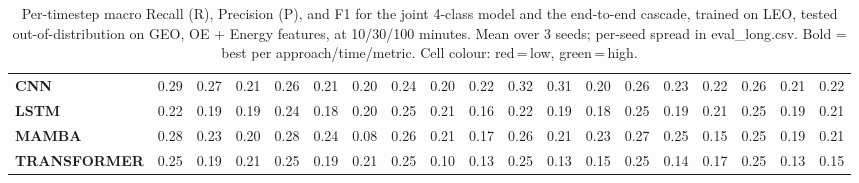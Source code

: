 \begin{table}[t]
{\begin{tabular}{l ccc ccc ccc ccc ccc ccc}
\textbf{CNN} & \cellcolor[HTML]{FF7C63}0.29 & \cellcolor[HTML]{FF7566}0.27 & \cellcolor[HTML]{FF6B6B}0.21 & \cellcolor[HTML]{FF6F69}0.26 & \cellcolor[HTML]{FF6B6B}0.21 & \cellcolor[HTML]{FF6B6B}0.20 & \cellcolor[HTML]{FF6B6B}0.24 & \cellcolor[HTML]{FF6B6B}0.20 & \cellcolor[HTML]{FF6B6B}0.22 & \cellcolor[HTML]{FF875E}0.32 & \cellcolor[HTML]{FF8360}0.31 & \cellcolor[HTML]{FF6B6B}0.20 & \cellcolor[HTML]{FF6F69}0.26 & \cellcolor[HTML]{FF6B6B}0.23 & \cellcolor[HTML]{FF6B6B}0.22 & \cellcolor[HTML]{FF6F69}0.26 & \cellcolor[HTML]{FF6B6B}0.21 & \cellcolor[HTML]{FF6B6B}0.22 \\
\textbf{LSTM} & \cellcolor[HTML]{FF6B6B}0.22 & \cellcolor[HTML]{FF6B6B}0.19 & \cellcolor[HTML]{FF6B6B}0.19 & \cellcolor[HTML]{FF6B6B}0.24 & \cellcolor[HTML]{FF6B6B}0.18 & \cellcolor[HTML]{FF6B6B}0.20 & \cellcolor[HTML]{FF6B6B}0.25 & \cellcolor[HTML]{FF6B6B}0.21 & \cellcolor[HTML]{FF6B6B}0.16 & \cellcolor[HTML]{FF6B6B}0.22 & \cellcolor[HTML]{FF6B6B}0.19 & \cellcolor[HTML]{FF6B6B}0.18 & \cellcolor[HTML]{FF6B6B}0.25 & \cellcolor[HTML]{FF6B6B}0.19 & \cellcolor[HTML]{FF6B6B}0.21 & \cellcolor[HTML]{FF6B6B}0.25 & \cellcolor[HTML]{FF6B6B}0.19 & \cellcolor[HTML]{FF6B6B}0.21 \\
\textbf{MAMBA} & \cellcolor[HTML]{FF7666}0.28 & \cellcolor[HTML]{FF6B6B}0.23 & \cellcolor[HTML]{FF6B6B}0.20 & \cellcolor[HTML]{FF7666}0.28 & \cellcolor[HTML]{FF6B6B}0.24 & \cellcolor[HTML]{FF6B6B}0.08 & \cellcolor[HTML]{FF7069}0.26 & \cellcolor[HTML]{FF6B6B}0.21 & \cellcolor[HTML]{FF6B6B}0.17 & \cellcolor[HTML]{FF7069}0.26 & \cellcolor[HTML]{FF6B6B}0.21 & \cellcolor[HTML]{FF6B6B}0.23 & \cellcolor[HTML]{FF7566}0.27 & \cellcolor[HTML]{FF6D6A}0.25 & \cellcolor[HTML]{FF6B6B}0.15 & \cellcolor[HTML]{FF6B6B}0.25 & \cellcolor[HTML]{FF6B6B}0.19 & \cellcolor[HTML]{FF6B6B}0.21 \\
\textbf{TRANSFORMER} & \cellcolor[HTML]{FF6B6B}0.25 & \cellcolor[HTML]{FF6B6B}0.19 & \cellcolor[HTML]{FF6B6B}0.21 & \cellcolor[HTML]{FF6B6B}0.25 & \cellcolor[HTML]{FF6B6B}0.19 & \cellcolor[HTML]{FF6B6B}0.21 & \cellcolor[HTML]{FF6B6B}0.25 & \cellcolor[HTML]{FF6B6B}0.10 & \cellcolor[HTML]{FF6B6B}0.13 & \cellcolor[HTML]{FF6B6B}0.25 & \cellcolor[HTML]{FF6B6B}0.13 & \cellcolor[HTML]{FF6B6B}0.15 & \cellcolor[HTML]{FF6B6B}0.25 & \cellcolor[HTML]{FF6B6B}0.14 & \cellcolor[HTML]{FF6B6B}0.17 & \cellcolor[HTML]{FF6B6B}0.25 & \cellcolor[HTML]{FF6B6B}0.13 & \cellcolor[HTML]{FF6B6B}0.15 \\
\bottomrule
\end{tabular}%
}
\caption{Per-timestep macro Recall (R), Precision (P), and F1 for the joint 4-class model and the end-to-end cascade, trained on LEO, tested out-of-distribution on GEO, OE + Energy features, at 10/30/100 minutes. Mean over 3 seeds; per-seed spread in eval\_long.csv. Bold = best per approach/time/metric. Cell colour: red\,=\,low, green\,=\,high.}
\label{tab:seq_leo_to_geo_phys_jc}
\end{table}
